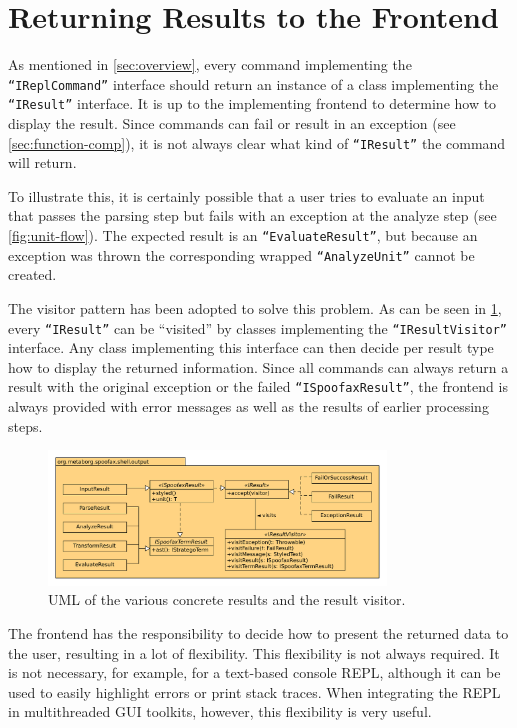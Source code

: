 \section{Returning Results to the Frontend}
\label{sec:visitor}

As mentioned in \cref{sec:overview}, every command implementing the
\texttt{``IReplCommand''} interface should return an instance of a class
implementing the \texttt{``IResult''} interface. It is up to the implementing
frontend to determine how to display the result. Since commands can fail or
result in an exception (see \cref{sec:function-comp}), it is not always clear
what kind of \texttt{``IResult''} the command will return.

To illustrate this, it is certainly possible that a user tries to evaluate an
input that passes the parsing step but fails with an exception at the analyze
step (see \cref{fig:unit-flow}).  The expected result is an
\texttt{``EvaluateResult''}, but because an exception was thrown the
corresponding wrapped \texttt{``AnalyzeUnit''} cannot be created.

The visitor pattern has been adopted to solve this problem. As can be seen in
\cref{fig:uml-visitor}, every \texttt{``IResult''} can be ``visited'' by classes
implementing the \texttt{``IResultVisitor''} interface. Any class implementing
this interface can then decide per result type how to display the returned
information. Since all commands can always return a result with the original
exception or the failed \texttt{``ISpoofaxResult''}, the frontend is always
provided with error messages as well as the results of earlier processing steps.

\begin{figure}[h]
  \centering
  \includegraphics[width=0.8\textwidth]{uml-visitor}
  \caption{UML of the various concrete results and the result visitor.}
  \label{fig:uml-visitor}
\end{figure}

The frontend has the responsibility to decide how to present the returned data
to the user, resulting in a lot of flexibility. This flexibility is not always
required. It is not necessary, for example, for a text-based console REPL,
although it can be used to easily highlight errors or print stack traces. When
integrating the REPL in multithreaded GUI toolkits, however, this flexibility is
very useful.
